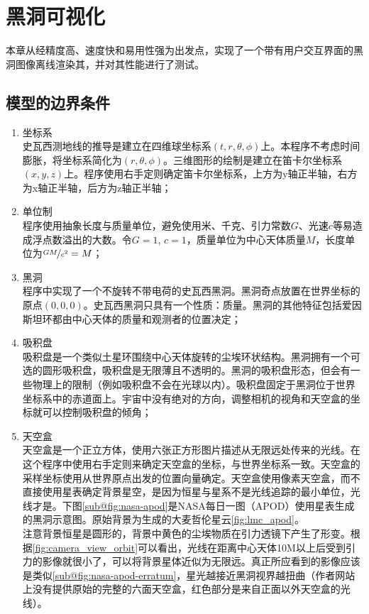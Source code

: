 \chapter{黑洞可视化}
本章从经精度高、速度快和易用性强为出发点，实现了一个带有用户交互界面的黑洞图像离线渲染其，并对其性能进行了测试。
\section{模型的边界条件}
\begin{enumerate}
    \item 坐标系 \\ 史瓦西测地线的推导是建立在四维球坐标系$\left(t,r,\theta,\phi\right)$上。本程序不考虑时间膨胀，将坐标系简化为$\left(r,\theta,\phi\right)$。三维图形的绘制是建立在笛卡尔坐标系$\left(x,y,z\right)$上。程序使用右手定则确定笛卡尔坐标系，上方为y轴正半轴，右方为x轴正半轴，后方为z轴正半轴；
    \item 单位制 \\ 程序使用抽象长度与质量单位，避免使用米、千克、引力常数$G$、光速$c$等易造成浮点数溢出的大数。令$G=1$, $c=1$，质量单位为中心天体质量$M$，长度单位为$\nicefrac{GM}{c^2}=M$；
    \item 黑洞 \\ 程序中实现了一个不旋转不带电荷的史瓦西黑洞。黑洞奇点放置在世界坐标的原点$\left(0,0,0\right)$。史瓦西黑洞只具有一个性质：质量。黑洞的其他特征包括爱因斯坦环都由中心天体的质量和观测者的位置决定；
    \item 吸积盘 \\ 吸积盘是一个类似土星环围绕中心天体旋转的尘埃环状结构。黑洞拥有一个可选的圆形吸积盘，吸积盘是无限薄且不透明的。黑洞的吸积盘形态，但会有一些物理上的限制（例如吸积盘不会在光球以内）。吸积盘固定于黑洞位于世界坐标系中的赤道面上。宇宙中没有绝对的方向，调整相机的视角和天空盒的坐标就可以控制吸积盘的倾角；
    \item 天空盒 \\ 天空盒是一个正立方体，使用六张正方形图片描述从无限远处传来的光线。在这个程序中使用右手定则来确定天空盒的坐标，与世界坐标系一致。天空盒的采样坐标使用从世界原点出发的位置向量确定。天空盒使用像素天空盒，而不直接使用星表确定背景星空，是因为恒星与星系不是光线追踪的最小单位，光线才是。下图\ref{sub@fig:nasa-apod}是NASA每日一图（APOD）\cite{raytraceusingstarcatalogue}使用星表生成的黑洞示意图。原始背景为生成的大麦哲伦星云\ref{fig:lmc_apod}。\\ 注意背景恒星是圆形的，背景中黄色的尘埃物质在引力透镜下产生了形变。根据\ref{fig:camera_view_orbit}可以看出，光线在距离中心天体10M以上后受到引力的影像就很小了，可以将背景星体近似为无限远。真正所应看到的影像应该是类似\ref{sub@fig:nasa-apod-erratum}，星光越接近黑洞视界越扭曲（作者网站上没有提供原始的完整的六面天空盒，红色部分是来自正面以外天空盒的光线）。

\end{enumerate}
